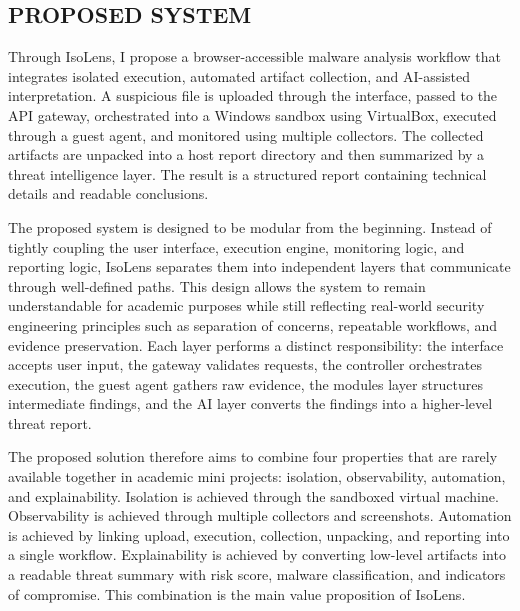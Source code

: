 \documentclass[a4paper,12pt,oneside]{report}
\begin{document}
\subsection{PROPOSED SYSTEM}
Through IsoLens, I propose a browser-accessible malware analysis workflow that integrates isolated execution, automated artifact collection, and AI-assisted interpretation. A suspicious file is uploaded through the interface, passed to the API gateway, orchestrated into a Windows sandbox using VirtualBox, executed through a guest agent, and monitored using multiple collectors. The collected artifacts are unpacked into a host report directory and then summarized by a threat intelligence layer. The result is a structured report containing technical details and readable conclusions.

\par

\par

The proposed system is designed to be modular from the beginning. Instead of tightly coupling the user interface, execution engine, monitoring logic, and reporting logic, IsoLens separates them into independent layers that communicate through well-defined paths. This design allows the system to remain understandable for academic purposes while still reflecting real-world security engineering principles such as separation of concerns, repeatable workflows, and evidence preservation. Each layer performs a distinct responsibility: the interface accepts user input, the gateway validates requests, the controller orchestrates execution, the guest agent gathers raw evidence, the modules layer structures intermediate findings, and the AI layer converts the findings into a higher-level threat report.

\par

\par

The proposed solution therefore aims to combine four properties that are rarely available together in academic mini projects: isolation, observability, automation, and explainability. Isolation is achieved through the sandboxed virtual machine. Observability is achieved through multiple collectors and screenshots. Automation is achieved by linking upload, execution, collection, unpacking, and reporting into a single workflow. Explainability is achieved by converting low-level artifacts into a readable threat summary with risk score, malware classification, and indicators of compromise. This combination is the main value proposition of IsoLens.
\end{document}
